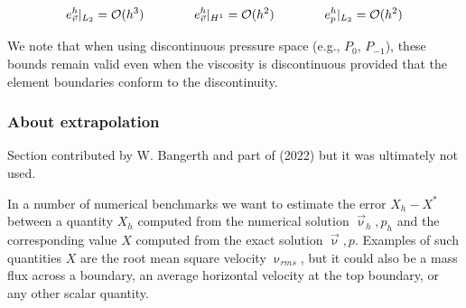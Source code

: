 \begin{equation}
e_{\vec v}^h|_{L_2} = {\cal O}(h^3)
\quad\quad\quad\quad
e_{\vec v}^h|_{H^1} = {\cal O}(h^2)
\quad\quad\quad\quad
e_{p}^h|_{L_2} = {\cal O}(h^2)
\end{equation}

We note that when using discontinuous pressure space
(e.g., $P_0$, $P_{-1}$), these bounds remain valid even
when the viscosity is discontinuous provided that the element boundaries conform to the discontinuity.

\subsubsection{About extrapolation}\label{ss:extrapolation}

Section contributed by W. Bangerth and part of \textcite{thba22} (2022) 
but it was ultimately not used. 

In a number of numerical benchmarks we
want to estimate the error $X_h-X^\ast$ between a quantity $X_h$ computed
from the numerical solution $\vec{\upnu}_h,p_h$ and the corresponding value
$X$ computed from the exact solution $\vec{\upnu},p$. Examples of such quantities
$X$ are the root mean square velocity $\upnu_{rms}$, but it could also be a mass flux
across a boundary, an average horizontal velocity at the top boundary, or
any other scalar quantity.

